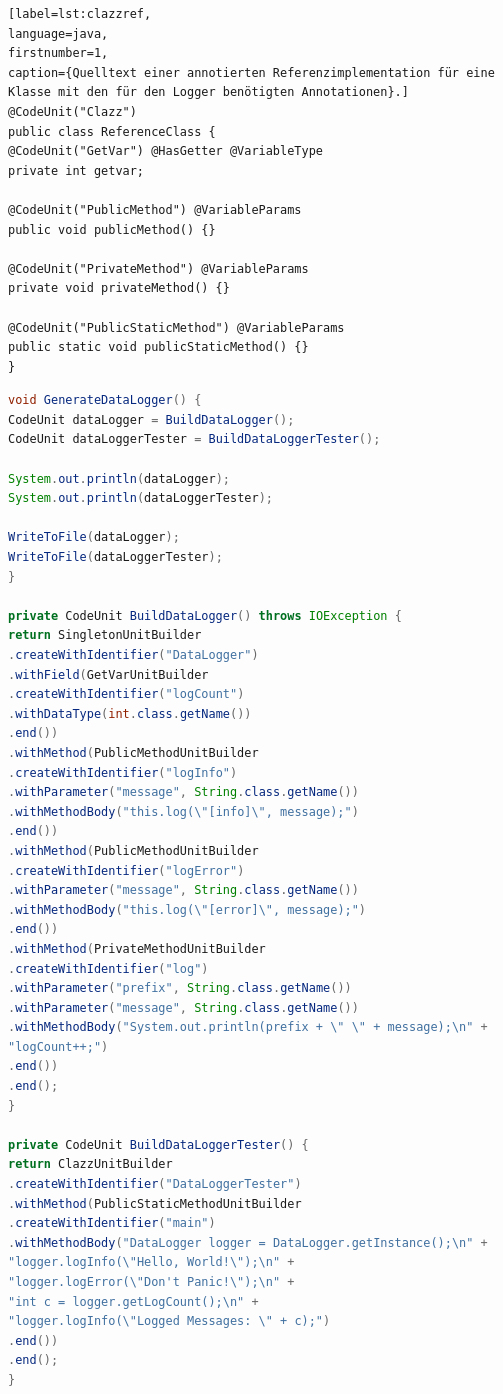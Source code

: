 \documentclass[12pt,oneside,a4paper,parskip]{scrbook}
\begin{document}
\begin{lstlisting}[label=lst:clazzref,
language=java,
firstnumber=1,
caption={Quelltext einer annotierten Referenzimplementation für eine Klasse mit den für den Logger benötigten Annotationen}.]
@CodeUnit("Clazz")
public class ReferenceClass {
@CodeUnit("GetVar") @HasGetter @VariableType
private int getvar;

@CodeUnit("PublicMethod") @VariableParams
public void publicMethod() {}

@CodeUnit("PrivateMethod") @VariableParams
private void privateMethod() {}

@CodeUnit("PublicStaticMethod") @VariableParams
public static void publicStaticMethod() {}
}
\end{lstlisting}

\begin{lstlisting}[label=lst:dataloggergen,
language=java,
firstnumber=1,
caption=Quelltext zur Erzeugung des DataLoggers und des zugehörigen Testers.]
void GenerateDataLogger() {
CodeUnit dataLogger = BuildDataLogger();
CodeUnit dataLoggerTester = BuildDataLoggerTester();

System.out.println(dataLogger);
System.out.println(dataLoggerTester);

WriteToFile(dataLogger);
WriteToFile(dataLoggerTester);
}

private CodeUnit BuildDataLogger() throws IOException {
return SingletonUnitBuilder
.createWithIdentifier("DataLogger")
.withField(GetVarUnitBuilder
.createWithIdentifier("logCount")
.withDataType(int.class.getName())
.end())
.withMethod(PublicMethodUnitBuilder
.createWithIdentifier("logInfo")
.withParameter("message", String.class.getName())
.withMethodBody("this.log(\"[info]\", message);")
.end())
.withMethod(PublicMethodUnitBuilder
.createWithIdentifier("logError")
.withParameter("message", String.class.getName())
.withMethodBody("this.log(\"[error]\", message);")
.end())
.withMethod(PrivateMethodUnitBuilder
.createWithIdentifier("log")
.withParameter("prefix", String.class.getName())
.withParameter("message", String.class.getName())
.withMethodBody("System.out.println(prefix + \" \" + message);\n" +
"logCount++;")
.end())
.end();
}

private CodeUnit BuildDataLoggerTester() {
return ClazzUnitBuilder
.createWithIdentifier("DataLoggerTester")
.withMethod(PublicStaticMethodUnitBuilder
.createWithIdentifier("main")
.withMethodBody("DataLogger logger = DataLogger.getInstance();\n" +
"logger.logInfo(\"Hello, World!\");\n" +
"logger.logError(\"Don't Panic!\");\n" +
"int c = logger.getLogCount();\n" +
"logger.logInfo(\"Logged Messages: \" + c);")
.end())
.end();
}


\end{lstlisting}
\end{document}
